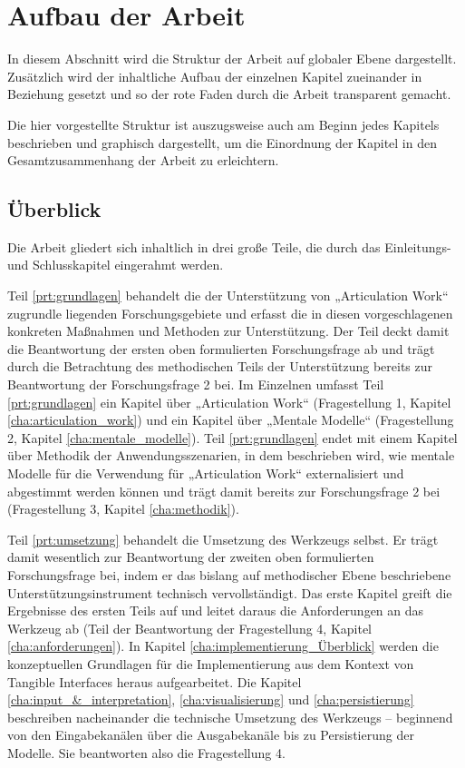 
\section{Aufbau der Arbeit} %
\label{sec:aufbau_der_arbeit}

In diesem Abschnitt wird die Struktur der Arbeit auf globaler Ebene dargestellt. Zusätzlich wird der inhaltliche Aufbau der einzelnen Kapitel zueinander in Beziehung gesetzt und so der rote Faden durch die Arbeit transparent gemacht.

Die hier vorgestellte Struktur ist auszugsweise auch am Beginn jedes Kapitels beschrieben und graphisch dargestellt, um die Einordnung der Kapitel in den Gesamtzusammenhang der Arbeit zu erleichtern.

\subsection{Überblick} %
\label{sub:aufbau_ueberblick}

Die Arbeit gliedert sich inhaltlich in drei große Teile, die durch das Einleitungs- und Schlusskapitel eingerahmt werden.

Teil \ref{prt:grundlagen} behandelt die der Unterstützung von „Articulation Work“ zugrundle liegenden Forschungsgebiete und erfasst die in diesen vorgeschlagenen konkreten Maßnahmen und Methoden zur Unterstützung. Der Teil deckt damit die Beantwortung der ersten oben formulierten Forschungsfrage ab und trägt durch die Betrachtung des methodischen Teils der Unterstützung bereits zur Beantwortung der Forschungsfrage 2 bei. Im Einzelnen umfasst Teil \ref{prt:grundlagen} ein Kapitel über „Articulation Work“ (Fragestellung 1, Kapitel \ref{cha:articulation_work}) und ein Kapitel über „Mentale Modelle“ (Fragestellung 2, Kapitel \ref{cha:mentale_modelle}). Teil \ref{prt:grundlagen} endet mit einem Kapitel über Methodik der Anwendungsszenarien, in dem beschrieben wird, wie mentale Modelle für die Verwendung für „Articulation Work“ externalisiert und abgestimmt werden können und trägt damit bereits zur Forschungsfrage 2 bei (Fragestellung 3, Kapitel \ref{cha:methodik}).

Teil \ref{prt:umsetzung} behandelt die Umsetzung des Werkzeugs selbst. Er trägt damit wesentlich zur Beantwortung der zweiten oben formulierten Forschungsfrage bei, indem er das bislang auf methodischer Ebene beschriebene Unterstützungsinstrument technisch vervollständigt. Das erste Kapitel greift die Ergebnisse des ersten Teils auf und leitet daraus die Anforderungen an das Werkzeug ab (Teil der Beantwortung der Fragestellung 4, Kapitel \ref{cha:anforderungen}). In Kapitel \ref{cha:implementierung_Überblick} werden die konzeptuellen Grundlagen für die Implementierung aus dem Kontext von Tangible Interfaces heraus aufgearbeitet. Die Kapitel \ref{cha:input_&_interpretation}, \ref{cha:visualisierung} und \ref{cha:persistierung} beschreiben nacheinander die technische Umsetzung des Werkzeugs -- beginnend von den Eingabekanälen über die Ausgabekanäle bis zu Persistierung der Modelle. Sie beantworten also die Fragestellung 4. 

